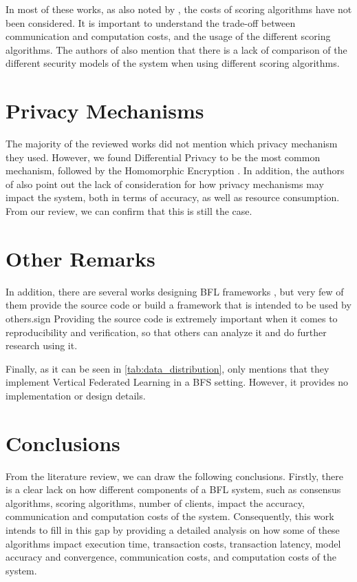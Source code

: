 In most of these works, as also noted by \cite{9403374, 10.48550/arxiv.2110.02182}, the costs of scoring algorithms have not been considered. It is important to understand the trade-off between communication and computation costs, and the usage of the different scoring algorithms. The authors of \cite{10.48550/arxiv.2110.02182} also mention that there is a lack of comparison of the different security models of the system when using different scoring algorithms.

\section{Privacy Mechanisms}\label{related_work:privacy}

The majority of the reviewed works did not mention which privacy mechanism they used. However, we found Differential Privacy \cite{10.48550/arxiv.2007.03856, Peyvandi2022, 9170559} to be the most common mechanism, followed by the Homomorphic Encryption \cite{8945913, 8894364}. In addition, the authors of \cite{9403374} also point out the lack of consideration for how privacy mechanisms may impact the system, both in terms of accuracy, as well as resource consumption. From our review, we can confirm that this is still the case.

\section{Other Remarks}\label{related_work:other_remarks}

In addition, there are several works designing BFL frameworks \cite{10.1145/3422337.3447837, 8945913, 10.48550/arxiv.1910.12603, 10.48550/arxiv.2110.02182}, but very few of them provide the source code or build a framework that is intended to be used by others.sign Providing the source code is extremely important when it comes to reproducibility and verification, so that others can analyze it and do further research using it.

Finally, as it can be seen in \autoref{tab:data_distribution}, only \cite{10.48550/arxiv.1912.04859} mentions that they implement Vertical Federated Learning in a BFS setting. However, it provides no implementation or design details.

\section{Conclusions}\label{related_work:conclusions}

From the literature review, we can draw the following conclusions. Firstly, there is a clear lack on how different components of a BFL system, such as consensus algorithms, scoring algorithms, number of clients, impact the accuracy, communication and computation costs of the system. Consequently, this work intends to fill in this gap by providing a detailed analysis on how some of these algorithms impact execution time, transaction costs, transaction latency, model accuracy and convergence, communication costs, and computation costs of the system.

